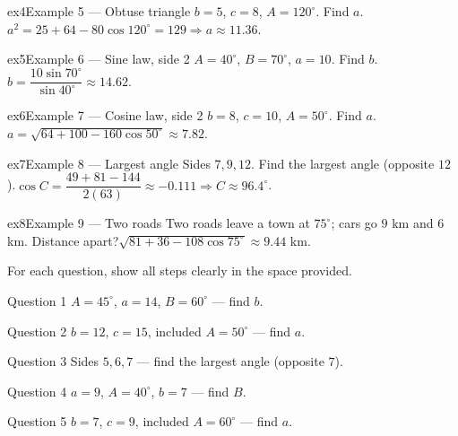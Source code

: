 \documentclass[11pt]{article}
\begin{document}
\begin{example}{ex4}{Example 5 --- Obtuse triangle}
$b=5$, $c=8$, $A=120^\circ$. Find $a$.\soln $a^2=25+64-80\cos120^\circ=129\Rightarrow a\approx11.36$.
\end{example}

\begin{example}{ex5}{Example 6 --- Sine law, side 2}
$A=40^\circ$, $B=70^\circ$, $a=10$. Find $b$.\soln $b=\dfrac{10\sin70^\circ}{\sin40^\circ}\approx14.62$.
\end{example}

\begin{example}{ex6}{Example 7 --- Cosine law, side 2}
$b=8$, $c=10$, $A=50^\circ$. Find $a$.\soln $a=\sqrt{64+100-160\cos50^\circ}\approx7.82$.
\end{example}

\begin{example}{ex7}{Example 8 --- Largest angle}
Sides $7,9,12$. Find the largest angle (opposite $12$).\soln $\cos C=\dfrac{49+81-144}{2(63)}\approx-0.111\Rightarrow C\approx96.4^\circ$.
\end{example}

\begin{example}{ex8}{Example 9 --- Two roads}
Two roads leave a town at $75^\circ$; cars go $9$ km and $6$ km. Distance apart?\soln $\sqrt{81+36-108\cos75^\circ}\approx9.44$ km.
\end{example}

\clearpage
{}
For each question, show all steps clearly in the space provided.

\begin{qbox}{Question 1}
$A=45^\circ$, $a=14$, $B=60^\circ$ — find $b$.\workspace{2.4cm}
\end{qbox}

\begin{qbox}{Question 2}
$b=12$, $c=15$, included $A=50^\circ$ — find $a$.\workspace{2.4cm}
\end{qbox}

\begin{qbox}{Question 3}
Sides $5,6,7$ — find the largest angle (opposite $7$).\workspace{2.4cm}
\end{qbox}

\begin{qbox}{Question 4}
$a=9$, $A=40^\circ$, $b=7$ — find $B$.\workspace{2.4cm}
\end{qbox}

\begin{qbox}{Question 5}
$b=7$, $c=9$, included $A=60^\circ$ — find $a$.\workspace{2.4cm}
\end{qbox}
\end{document}
